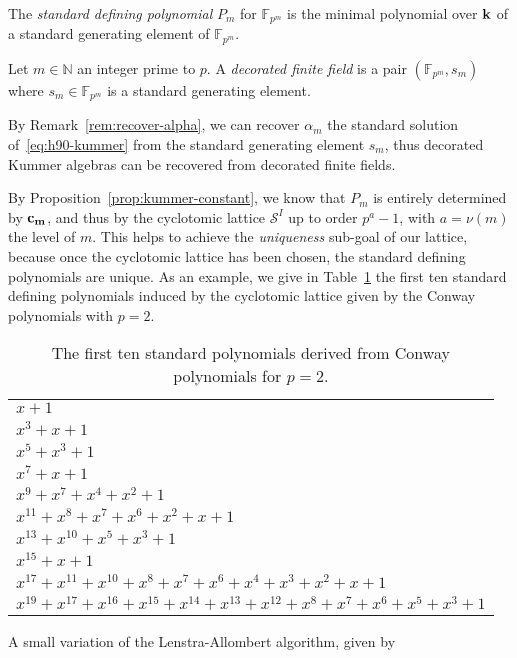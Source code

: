 \begin{defi}
  The \emph{standard defining polynomial} $P_m$ for $\mathbb{F}_{p^{m}}$ is the
  minimal polynomial over $\mathbf{k}$ of a standard generating element of
  $\mathbb{F}_{p^{m}}$.
\end{defi}
\begin{defi}
  Let $m\in\mathbb{N}$ an integer prime to $p$. A \emph{decorated finite field}
  is a pair $(\mathbb{F}_{p^{m}}, s_m)$ where $s_m\in\mathbb{F}_{p^{m}}$ is a
  standard generating element.
\end{defi}
\begin{rem}
  By Remark~\ref{rem:recover-alpha}, we can recover $\alpha_m$ the standard
  solution of~\eqref{eq:h90-kummer} from the standard generating element $s_m$,
  thus decorated Kummer algebras can be recovered from
  decorated finite fields.
\end{rem}
By Proposition~\ref{prop:kummer-constant}, we know that $P_m$ is entirely 
determined by $\mathbf{c_{m}}$, and thus by the cyclotomic lattice $\mathcal S^I$ up
to order $p^a-1$, with $a=\nu(m)$ the level of $m$. This helps to achieve the
\emph{uniqueness} sub-goal of our lattice, because once the cyclotomic lattice
has been chosen, the standard defining polynomials are unique. As an example, we
give in Table~\ref{tab:std-polys} the first ten standard defining polynomials
induced by the cyclotomic lattice given by the Conway polynomials with $p=2$.
\begin{table}
  \centering
  \begin{tabular}{l}
    $x+1$ \\
    $x^3+x+1$ \\
    $x^5+x^3+1$ \\
    $x^7+x+1$ \\
    $x^9+x^7+x^4+x^2+1$\\
    $x^{11}+x^8+x^7+x^6+x^2+x+1$\\
    $x^{13}+x^{10}+x^5+x^3+1$\\
    $x^{15}+x+1$ \\
    $x^{17}+x^{11}+x^{10}+x^8+ x^7+x^6+x^4+x^3+x^2+x+1$ \\
    $x^{19}+x^{17}+x^{16}+x^{15}+x^{14}+x^{13}+x^{12}+x^8+x^7+x^6+x^5+x^3+1$
  \end{tabular}
  \caption{The first ten standard polynomials derived from Conway
    polynomials for $p=2$.}
  \label{tab:std-polys}
\end{table}
A small variation of the Lenstra-Allombert algorithm, given by
